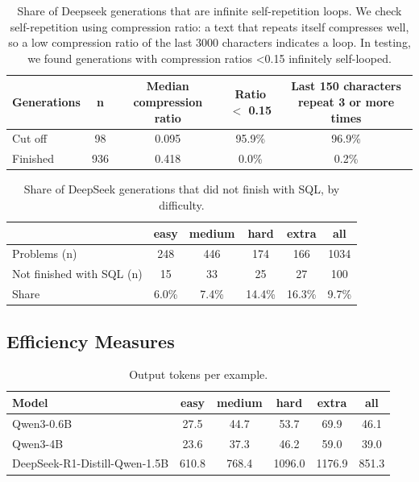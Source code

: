 \begin{table}[H]
\centering
\footnotesize
\caption{Share of Deepseek generations that are infinite self-repetition loops. We check self-repetition using compression ratio: a text that repeats itself compresses well, so a low compression ratio of the last 3000 characters indicates a loop. In testing, we found generations with compression ratios <0.15 infinitely self-looped.}
\label{tab:deepseek-repetition}
\begin{tabular}{lcccc}
\toprule
Generations & n & Median compression ratio & Ratio $<$ 0.15 & Last 150 characters repeat 3 or more times \\
\midrule
Cut off & 98 & 0.095 & 95.9\% & 96.9\% \\
Finished & 936 & 0.418 & 0.0\% & 0.2\% \\
\bottomrule
\end{tabular}
\end{table}

\begin{table}[H]
\centering
\footnotesize
\caption{Share of DeepSeek generations that did not finish with SQL, by difficulty.}
\label{tab:deepseek-unfinished-by-difficulty}
\begin{tabular}{lccccc}
\toprule
 & easy & medium & hard & extra & all \\
\midrule
Problems (n) & 248 & 446 & 174 & 166 & 1034 \\
Not finished with SQL (n) & 15 & 33 & 25 & 27 & 100 \\
Share & 6.0\% & 7.4\% & 14.4\% & 16.3\% & 9.7\% \\
\bottomrule
\end{tabular}
\end{table}

\subsection{Efficiency Measures}
\label{sec:efficiency}

\begin{table}[H]
\centering
\footnotesize
\caption{Output tokens per example.}
\label{tab:tokens-per-example}
\begin{tabular}{lccccc}
\toprule
Model & easy & medium & hard & extra & all \\
\midrule
Qwen3-0.6B & 27.5 & 44.7 & 53.7 & 69.9 & 46.1 \\
Qwen3-4B & 23.6 & 37.3 & 46.2 & 59.0 & 39.0 \\
DeepSeek-R1-Distill-Qwen-1.5B & 610.8 & 768.4 & 1096.0 & 1176.9 & 851.3 \\
\bottomrule
\end{tabular}
\end{table}


